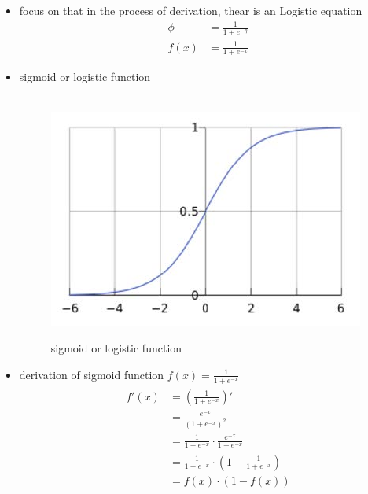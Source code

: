 \documentclass[12pt]{ctexart}%
\begin{document}
		\begin{itemize}
			\item focus on that in the process of derivation, thear is an Logistic equation
			\begin{align}
				\phi &= \frac{1}{1+e^{-\eta}} \\
				f(x) &= \frac{1}{1+e^{-x}}
			\end{align}
			
			\item sigmoid or logistic function
				\begin{figure}[H]
				\vspace{-0.2cm}  %
				\setlength{\abovecaptionskip}{-0.2cm}   %
				\centering
				\includegraphics[scale=0.4]{sigmoid_or_logistic_function.jpg}
				\renewcommand{\figurename}{Fig} %
				\caption{sigmoid or logistic function}
				\label{fig:1}
				\end{figure}
			
			\item derivation of sigmoid function $f(x) = \frac{1}{1+e^{-x}}$
				\begin{align}
					\begin{split}
						f'(x) &= (\frac{1}{1+e^{-x}})'\\
							  &= \frac{e^{-x}}{(1+e^{-x})^2}\\
							  &= \frac{1}{1+e^{-x}}\cdot\frac{e^{-x}}{1+e^{-x}}\\
                              &= \frac{1}{1+e^{-x}}\cdot(1-\frac{1}{1+e^{-x}})\\
						  	  &= f(x)\cdot(1-f(x))
					\end{split}
				\end{align}
		\end{itemize}
	
\end{document}
